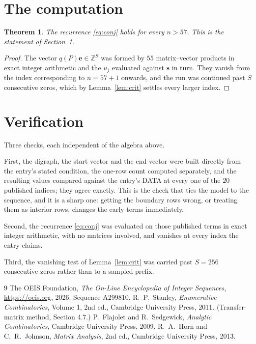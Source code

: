 \documentclass[11pt,a4paper]{article}
\theoremstyle{plain}
\newtheorem{theorem}{Theorem}
\theoremstyle{definition}
\begin{document}
\section{The computation}

\begin{theorem}
The recurrence \eqref{eq:conj} holds for every $n>57$. This is the statement of
Section~1.
\end{theorem}

\begin{proof}
The vector $q(P)\mathbf{e}\in\mathbb{Z}^{S}$ was formed by $55$ matrix--vector
products in exact integer arithmetic and the $u_j$ evaluated against $\mathbf{s}$ in turn.
They vanish from the index corresponding to $n=57+1$ onwards, and the run was continued
past $S$ consecutive zeros, which by Lemma~\ref{lem:crit} settles every larger index.
\end{proof}

\section{Verification}

Three checks, each independent of the algebra above.

First, the digraph, the start vector and the end vector were built directly from the
entry's stated condition, the one-row count computed separately, and the resulting values
compared against the entry's DATA at every one of the $20$ published indices; they
agree exactly. This is the check that ties the model to the sequence, and it is a sharp one:
getting the boundary rows wrong, or treating them as interior rows, changes the early terms
immediately.

Second, the recurrence \eqref{eq:conj} was evaluated on those published terms in exact
integer arithmetic, with no matrices involved, and vanishes at every index the entry claims.

Third, the vanishing test of Lemma~\ref{lem:crit} was carried past $S=256$ consecutive
zeros rather than to a sampled prefix.

\begin{thebibliography}{9}
 The OEIS Foundation, \emph{The On-Line Encyclopedia of Integer
Sequences}, \url{https://oeis.org}, 2026. Sequence A299810.
 R.~P.~Stanley, \emph{Enumerative Combinatorics}, Volume 1, 2nd ed.,
Cambridge University Press, 2011. (Transfer-matrix method, Section 4.7.)
 P.~Flajolet and R.~Sedgewick, \emph{Analytic Combinatorics}, Cambridge
University Press, 2009.
 R.~A.~Horn and C.~R.~Johnson, \emph{Matrix Analysis}, 2nd ed., Cambridge
University Press, 2013.
\end{thebibliography}
\end{document}
